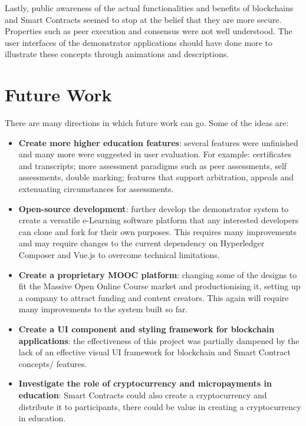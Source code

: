 Lastly, public awareness of the actual functionalities and benefits of blockchains 
and Smart Contracts seemed to stop at the belief that they are more secure. Properties 
such as peer execution and consensus were not well understood. The user interfaces of 
the demonstrator applications should have done more to illustrate these concepts 
through animations and descriptions.

\section{Future Work}

There are many directions in which future work can go. Some of the ideas are:

\begin{itemize}
    \item \textbf{Create more higher education features}: 
    several features were unfinished and many more were suggested in user evaluation. 
    For example: certificates and transcripts; more assessment paradigms such as peer assessments, 
    self assessments, double marking; features that support arbitration, 
    appeals and extenuating circumstances for assessments.
    \item \textbf{Open-source development}:
    further develop the demonstrator system to create a versatile e-Learning software 
    platform that any interested developers can clone and fork for their own purposes. 
    This requires many improvements and may require changes to the current dependency on 
    Hyperledger Composer and Vue.js to overcome technical limitations.
    \item \textbf{Create a proprietary MOOC platform}:
    changing some of the designs to fit the Massive Open Online Course market 
    and productionising it, setting up a company to attract funding and content creators. 
    This again will require many improvements to the system built so far.
    \item \textbf{Create a UI component and styling framework for blockchain applications}:
    the effectiveness of this project was partially dampened by the lack of 
    an effective visual UI framework for blockchain and Smart Contract concepts/ features.
    \item \textbf{Investigate the role of cryptocurrency and micropayments in education}:
    Smart Contracts could also create a cryptocurrency and distribute it to participants, 
    there could be value in creating a cryptocurrency in education.
\end{itemize}

